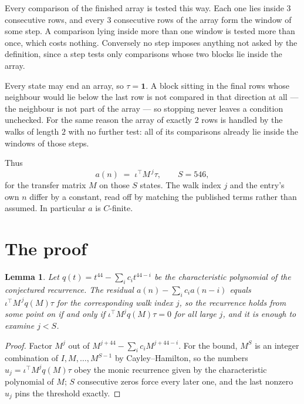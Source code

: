 \documentclass[11pt,a4paper]{article}
\theoremstyle{plain}
\newtheorem{lemma}[theorem]{Lemma}
\theoremstyle{definition}
\begin{document}
Every comparison of the finished array is tested this way. Each one lies inside $3$
consecutive rows, and every $3$ consecutive rows of the array form the window of some
step. A comparison lying inside more than one window is tested more than once, which costs
nothing. Conversely no step imposes anything not asked by the definition, since a step tests
only comparisons whose two blocks lie inside the array.

Every state may end an array, so $\tau=\mathbf{1}$. A block sitting in the final rows whose
neighbour would lie below the last row is not compared in that direction at all --- the
neighbour is not part of the array --- so stopping never leaves a condition unchecked. For the
same reason the array of exactly $2$ rows is handled by the walks of length $2$ with no
further test: all of its comparisons already lie inside the windows of those steps.

Thus
\[
a(n)\;=\;\iota^{\!\top}M^{\,j}\tau ,\qquad S=546,
\]
for the transfer matrix $M$ on those $S$ states. The walk index $j$ and the entry's own $n$
differ by a constant, read off by matching the published terms rather than assumed. In
particular $a$ is $C$-finite.

\section{The proof}

\begin{lemma}\label{lem:crit}
Let $q(t)=t^{44}-\sum_i c_it^{44-i}$ be the characteristic polynomial of the
conjectured recurrence. The residual $a(n)-\sum_ic_ia(n-i)$ equals
$\iota^{\!\top}M^{\,j}q(M)\tau$ for the corresponding walk index $j$, so the recurrence
holds from some point on if and only if $\iota^{\!\top}M^{j}q(M)\tau=0$ for all large $j$,
and it is enough to examine $j<S$.
\end{lemma}

\begin{proof}
Factor $M^{j}$ out of $M^{j+44}-\sum_ic_iM^{j+44-i}$. For the bound, $M^{S}$
is an integer combination of $I,M,\dots,M^{S-1}$ by Cayley--Hamilton, so the numbers
$u_j=\iota^{\!\top}M^{j}q(M)\tau$ obey the monic recurrence given by the characteristic
polynomial of $M$; $S$ consecutive zeros force every later one, and the last nonzero $u_j$
pins the threshold exactly.
\end{proof}
\end{document}
